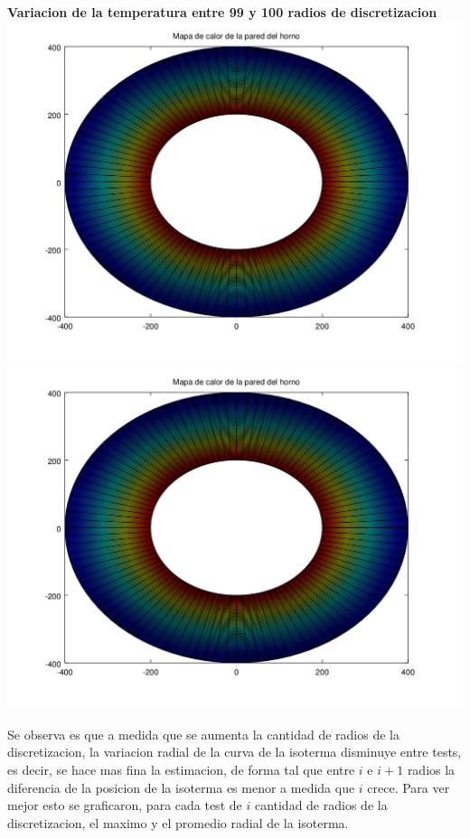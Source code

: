 \begin{enumerate}
	\textbf{Variacion de la temperatura entre 99 y 100 radios de discretizacion}\\
	\includegraphics[scale=0.35]{experimentos1a_1b/evolucion_posicion_isoterma_temperatura/test2/test6_099_radios_inst_001_heatmap.png}
	\includegraphics[scale=0.35]{experimentos1a_1b/evolucion_posicion_isoterma_temperatura/test2/test6_100_radios_inst_001_heatmap.png}

\vspace{0.5cm}

Se observa es que a medida que se aumenta la cantidad de radios de la discretizacion, la variacion radial de la curva de la isoterma disminuye entre tests, es decir, se hace mas fina la estimacion, de forma tal que entre $i$ e $i+1$ radios la diferencia de la posicion de la isoterma es menor a medida que $i$ crece. Para ver mejor esto se graficaron, para cada test de $i$ cantidad de radios de la discretizacion, el maximo y el promedio radial de la isoterma.


\end{enumerate}
